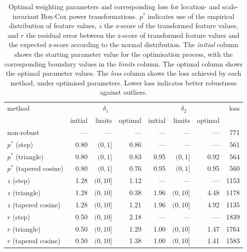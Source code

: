 \documentclass[preprint,12pt,authoryear]{elsarticle}
\begin{document}
\begin{table}
\begin{center}
\caption{Optimal weighting parameters and corresponding loss for location- and scale-invariant Box-Cox power transformations. $p^{*}$ indicates use of the empirical distribution of feature values, $z$ the z-score of the transformed feature values, and $r$ the residual error between the z-score of transformed feature values and the expected z-score according to the normal distribution. The \textit{initial} column shows the starting parameter value for the optimisation process, with the corresponding boundary values in the \textit{limits} column. The {optimal} column shows the optimal parameter values. The \textit{loss} column shows the loss achieved by each method, under optimised parameters. Lower loss indicates better robustness against outliers.}
\label{tab:optimal-weighting-parameters-box-cox}
\begin{tabular}{l r r r r r r r}

\toprule
method & \multicolumn{3}{c}{$\delta_1$} & \multicolumn{3}{c}{$\delta_2$} & loss \\
& initial & limits & optimal & initial & limits & optimal & \\

\midrule
non-robust               & ---  & ---       & ---  & ---  & ---       & ---  & 771 \\
$p^{*}$ (step)           & 0.80 & $(0, 1]$  & 0.86 & ---  & ---       & ---  & 561 \\
$p^{*}$ (triangle)       & 0.80 & $(0, 1]$  & 0.83 & 0.95 & $(0, 1]$  & 0.92 & 564 \\
$p^{*}$ (tapered cosine) & 0.80 & $(0, 1]$  & 0.76 & 0.95 & $(0, 1]$  & 0.95 & 560 \\
$z$ (step)               & 1.28 & $(0, 10]$ & 1.12 & ---  & ---       & ---  & 1153 \\
$z$ (triangle)           & 1.28 & $(0, 10]$ & 0.38 & 1.96 & $(0, 10]$ & 4.48 & 1178 \\
$z$ (tapered cosine)     & 1.28 & $(0, 10]$ & 1.21 & 1.96 & $(0, 10]$ & 4.92 & 1135 \\
$r$ (step)               & 0.50 & $(0, 10]$ & 2.18 & ---  & ---       & ---  & 1839 \\
$r$ (triangle)           & 0.50 & $(0, 10]$ & 1.29 & 1.00 & $(0, 10]$ & 1.47 & 1764 \\
$r$ (tapered cosine)     & 0.50 & $(0, 10]$ & 1.38 & 1.00 & $(0, 10]$ & 1.41 & 1583 \\
\bottomrule
\end{tabular}
\end{center}
\end{table}
\end{document}
